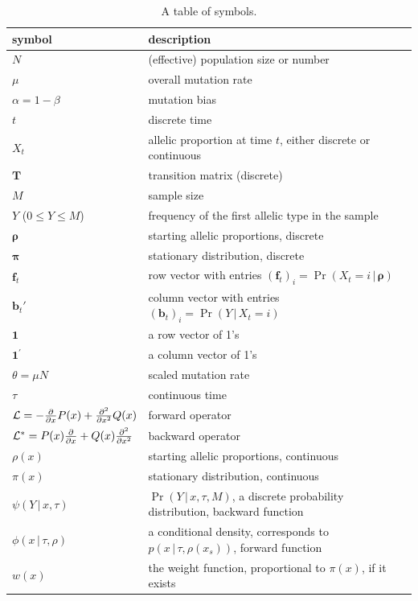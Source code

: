 \documentclass[preprint]{elsarticle}
\newcommand{\bs}[1]{\ensuremath{\boldsymbol{#1}}}
\newcommand\given{{\,|\,}}
\newcommand\x[1]{\ensuremath{X_{#1}}}
\newcommand\y{\ensuremath{Y}}
\newcommand\fv[1]{\ensuremath{\mathbf{f}_{#1}}}
\newcommand\bv[1]{\ensuremath{\mathbf{b}_{#1}}}
\begin{document}
\begin{table}[ht]
\centering
\caption{A table of symbols.}
  \begin{tabular}{l|l}
  \toprule
    symbol& description\\
    \midrule
    $N$& (effective) population size or number\\
    $\mu$ &overall mutation rate\\
    $\alpha=1-\beta$ &mutation bias\\
    $t$& discrete time\\
    $\x{t}$ &allelic proportion at time $t$, either discrete or continuous\\
    $\mathbf{T}$& transition matrix (discrete)\\
    $M$&sample size\\
    $\y$ ($0 \le \y \le M$) &frequency of the first allelic type in the sample\\
    $\bs{\rho}$ &starting allelic proportions, discrete\\
    $\bs{\pi}$ &stationary distribution, discrete\\
    $\fv{t}$ &row vector with entries $(\fv{t})_{i} = \Pr(\x{t} = i\given \bs{\rho})$\\
    $\bv{t}'$ &column vector with entries $(\bv{t})_{i} = \Pr(\y\given \x{t} = i)$\\
    $\mathbf{1}$ &a row vector of 1's\\
    $\mathbf{1}^{'}$ &a column vector of 1's\\
    \midrule
    $\theta=\mu N$ &scaled mutation rate\\
    $\tau$&continuous time\\
    ${\cal L}=-\frac{\partial}{\partial x}P(x)+ \frac{\partial^2}{\partial x^2}Q(x)$ &forward operator\\
    ${\cal L}^{*}=P(x)\frac{\partial}{\partial x} +Q(x)\frac{\partial^2}{\partial x^2}$&backward operator\\
    $\rho(x)$ &starting allelic proportions, continuous\\
    $\pi(x)$ &stationary distribution, continuous\\
    $\psi(\y\given x,\tau)$ &$\Pr(\y\given x,\tau,M)$, a discrete probability distribution, backward function\\
    $\phi(x\given \tau,\rho)$ &a conditional density, corresponds to $p(x\given \tau,\rho(x_s))$,  forward function\\
    $w(x)$ &the weight function, proportional to $\pi(x)$, if it exists\\

\end{tabular}
\end{table}
\end{document}
